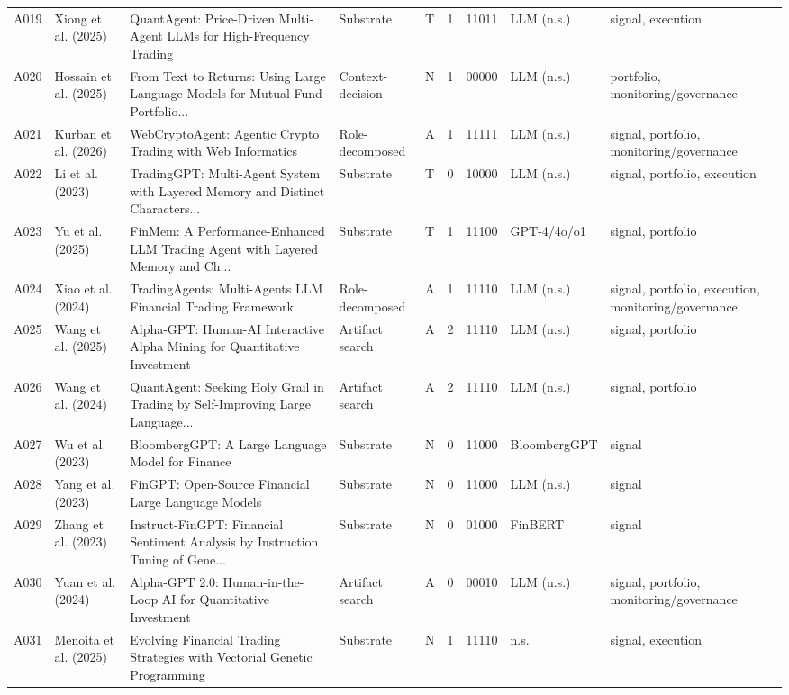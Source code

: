 \begin{longtable}{p{0.7cm} p{1.9cm} p{3.85cm} p{1.7cm} p{0.65cm} p{0.55cm} p{1.2cm} p{1.8cm} p{2.0cm}}
A019 & Xiong et al. (2025) & QuantAgent: Price-Driven Multi-Agent LLMs for High-Frequency Trading & Substrate & T & 1 & 11011 & LLM (n.s.) & signal, execution \\
A020 & Hossain et al. (2025) & From Text to Returns: Using Large Language Models for Mutual Fund Portfolio... & Context-decision & N & 1 & 00000 & LLM (n.s.) & portfolio, monitoring/governance \\
A021 & Kurban et al. (2026) & WebCryptoAgent: Agentic Crypto Trading with Web Informatics & Role-decomposed & A & 1 & 11111 & LLM (n.s.) & signal, portfolio, monitoring/governance \\
A022 & Li et al. (2023) & TradingGPT: Multi-Agent System with Layered Memory and Distinct Characters... & Substrate & T & 0 & 10000 & LLM (n.s.) & signal, portfolio, execution \\
A023 & Yu et al. (2025) & FinMem: A Performance-Enhanced LLM Trading Agent with Layered Memory and Ch... & Substrate & T & 1 & 11100 & GPT-4/4o/o1 & signal, portfolio \\
A024 & Xiao et al. (2024) & TradingAgents: Multi-Agents LLM Financial Trading Framework & Role-decomposed & A & 1 & 11110 & LLM (n.s.) & signal, portfolio, execution, monitoring/governance \\
A025 & Wang et al. (2025) & Alpha-GPT: Human-AI Interactive Alpha Mining for Quantitative Investment & Artifact search & A & 2 & 11110 & LLM (n.s.) & signal, portfolio \\
A026 & Wang et al. (2024) & QuantAgent: Seeking Holy Grail in Trading by Self-Improving Large Language... & Artifact search & A & 2 & 11110 & LLM (n.s.) & signal, portfolio \\
A027 & Wu et al. (2023) & BloombergGPT: A Large Language Model for Finance & Substrate & N & 0 & 11000 & BloombergGPT & signal \\
A028 & Yang et al. (2023) & FinGPT: Open-Source Financial Large Language Models & Substrate & N & 0 & 11000 & LLM (n.s.) & signal \\
A029 & Zhang et al. (2023) & Instruct-FinGPT: Financial Sentiment Analysis by Instruction Tuning of Gene... & Substrate & N & 0 & 01000 & FinBERT & signal \\
A030 & Yuan et al. (2024) & Alpha-GPT 2.0: Human-in-the-Loop AI for Quantitative Investment & Artifact search & A & 0 & 00010 & LLM (n.s.) & signal, portfolio, monitoring/governance \\
A031 & Menoita et al. (2025) & Evolving Financial Trading Strategies with Vectorial Genetic Programming & Substrate & N & 1 & 11110 & n.s. & signal, execution \\

\end{longtable}
